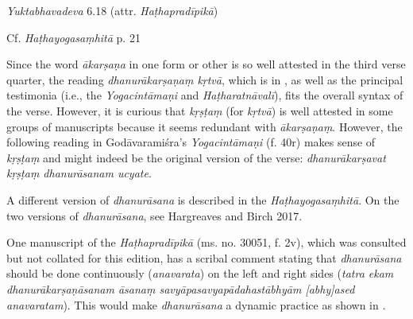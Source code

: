 \begin{ekdosis}
\begin{testimonia}[hp01_025]
\emph{Yuktabhavadeva} 6.18 (attr. \emph{Haṭhapradīpikā})

\begin{versinnote}
\end{versinnote}

Cf. \emph{Haṭhayogasaṃhitā} p. 21

\begin{versinnote}
\end{versinnote}

\end{testimonia}

\begin{philcomm}[hp01_025]
Since the word \emph{ākarṣaṇa} in one form or other is so well attested in the third verse quarter, the reading \emph{dhanurākarṣaṇaṃ kṛtvā}, which is in \epsilonTwo, as well as the principal testimonia (i.e., the \emph{Yogacintāmaṇi} and \emph{Haṭharatnāvalī}), fits the overall syntax of the verse. However, it is curious that \emph{kṛṣṭaṃ} (for \emph{kṛtvā}) is well attested in some groups of manuscripts because it seems redundant with \emph{ākarṣaṇaṃ}. However, the following reading in 
Godāvaramiśra's \emph{Yogacintāmaṇi} (f. 40r) makes sense of \emph{kṛṣṭaṃ} and might indeed be the original version of the verse: \emph{dhanurākarṣavat kṛṣṭaṃ dhanurāsanam ucyate}.

A different version of \emph{dhanurāsana} is described in the \emph{Haṭhayogasaṃhitā}. On the two versions of \emph{dhanurāsana}, see Hargreaves and Birch 2017.

One manuscript of the \emph{Haṭhapradīpikā} (ms. no. 30051, f. 2v), which was consulted but not collated for this edition, has a scribal comment stating that \emph{dhanurāsana} should be done continuously (\emph{anavarata}) on the left and right sides (\emph{tatra ekam dhanurākarṣaṇāsanam āsanaṃ savyāpasavyapādahastābhyām [abhy]ased anavaratam}). This would make \emph{dhanurāsana} a dynamic practice as shown in . 
\end{philcomm}


\end{ekdosis}
